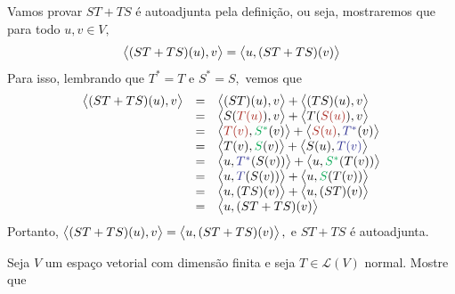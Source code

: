 \documentclass[11pt,a4paper]{article}
\begin{document}
{{\task[\pers{e}] Vamos provar $ST + TS$ é autoadjunta pela definição, ou seja, mostraremos que para todo $u,v \in V,$ 
\[
\left\langle (ST + TS)(u), v \right\rangle = \left\langle u, (ST + TS)(v) \right\rangle
\]
Para isso, lembrando que $T^{*} = T$ e $S^{*} = S,$ vemos que
\[
\begin{array}{rcl}
\prin{(ST+TS)(u),v} & = & \prin{(ST)(u),v} + \prin{(TS)(u), v} \\
& =&  \prin{S(\textcolor{Mahogany}{T(u)}),v} + \prin{T(\textcolor{Mahogany}{S(u)}), v} \\
& =&  \prin{\textcolor{Mahogany}{T(v)},\textcolor{Green}{S^{*}}(v)} + \prin{\textcolor{Mahogany}{S(u)}, \textcolor{Blue}{T^{*}}(v)} \\
& =&  \prin{T(v),\textcolor{Green}{S}(v)} + \prin{S(u), \textcolor{Blue}{T(v)}} \\
&=& \prin{u,  \textcolor{Blue}{T^{*}}(S(v))} + \prin{u, \textcolor{Green}{S^{*}}(T(v))} \\
&=& \prin{u,  \textcolor{Blue}{T}(S(v))} + \prin{u, \textcolor{Green}{S}(T(v))} \\
&=& \prin{u,(TS)(v)} + \prin{u, (ST)(v)} \\
& = & \prin{u, (ST + TS)(v)}
\end{array}
\]
Portanto, $\left\langle (ST+TS)(u),v \right\rangle =  \left\langle u, (ST + TS)(v) \right\rangle,$ e $ST + TS$ é autoadjunta.
}
}

 Seja $V$ um espaço vetorial com dimensão finita e seja $T \in \mathcal{L}(V)$ normal. Mostre que
\end{document}
